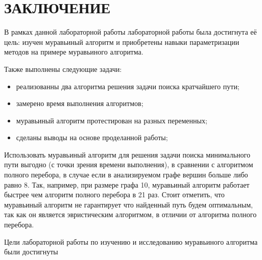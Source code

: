 \chapter*{ЗАКЛЮЧЕНИЕ}

В рамках данной лабораторной работы лабораторной работы была достигнута её цель: изучен муравьиный алгоритм и приобретены навыки параметризации методов на примере муравьиного алгоритма.

Также выполнены следующие задачи:	
\begin{itemize}
	\item реализованны два алгоритма решения задачи поиска кратчайшего пути;
	\item замерено время выполнения алгоритмов;
	\item муравьиный алгоритм протестирован на разных переменных;
	\item сделаны выводы на основе проделанной работы;
\end{itemize}

Использовать муравьиный алгоритм для решения задачи поиска минимального пути выгодно (с точки зрения времени выполнения),
в сравнении с алгоритмом полного перебора, в случае если в анализируемом графе вершин больше либо равно 8. 
Так, например, при размере графа 10, муравьиный алгоритм работает быстрее чем алгоритм полного перебора в 21 раз. 
Стоит отметить, что муравьиный алгоритм не гарантирует что найденный путь будем оптимальным, так как он является эвристическим алгоритмом, в отличии от алгоритма полного перебора.

\indent Цели лабораторной работы по изучению и исследованию муравьиного алгоритма были достигнуты
